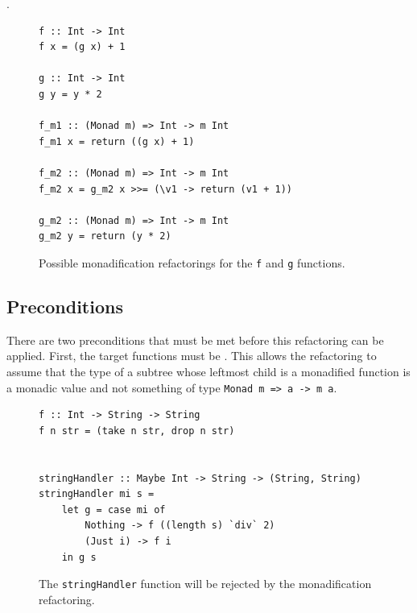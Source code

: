 \texttt{} \texttt{} \texttt{}\texttt{} \DIFaddend \texttt{\DIFdelbegin \DIFdel{>>=}\DIFdelend \DIFaddbegin {}\DIFaddend }\DIFdelbegin {}\DIFdelend . 

\begin{figure}[t]
\begin{lstlisting}
f :: Int -> Int
f x = (g x) + 1

g :: Int -> Int
g y = y * 2

f_m1 :: (Monad m) => Int -> m Int
f_m1 x = return ((g x) + 1)

f_m2 :: (Monad m) => Int -> m Int
f_m2 x = g_m2 x >>= (\v1 -> return (v1 + 1))

g_m2 :: (Monad m) => Int -> m Int
g_m2 y = return (y * 2)
\end{lstlisting}
\caption{Possible monadification refactorings for the \texttt{f} and \texttt{g} functions.}
\label{fgMon}
\end{figure} 

\subsection{Preconditions}

There are two preconditions that must be met before this refactoring can be applied. First, \DIFaddbegin {}\DIFaddend the target functions must be \DIFdelbegin {}\DIFdelend \DIFaddbegin {}\DIFaddend . This allows the refactoring to assume that the type of a subtree whose leftmost child is a monadified function is a monadic value and not something of type \texttt{Monad m => a -> m a}. 

\begin{figure}[t]
\begin{lstlisting}
f :: Int -> String -> String
f n str = (take n str, drop n str)


stringHandler :: Maybe Int -> String -> (String, String)
stringHandler mi s = 
	let g = case mi of
		Nothing -> f ((length s) `div` 2)
		(Just i) -> f i
	in g s
\end{lstlisting}
\caption{The \texttt{stringHandler} function will be rejected by the monadification refactoring.}
\label{strHan}
\end{figure}

